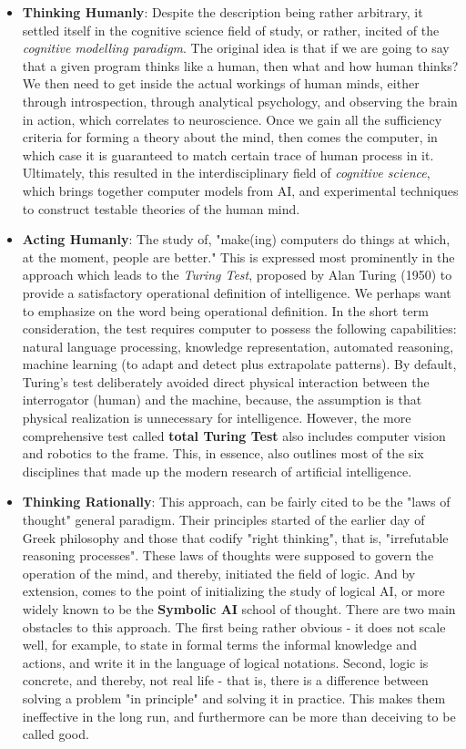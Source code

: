     \begin{itemize}
        \item \textbf{Thinking Humanly}: Despite the description being rather arbitrary, it settled itself in the cognitive science field of study, or rather, incited of the \textit{cognitive modelling paradigm}. The original idea is that if we are going to say that a given program thinks like a human, then what and how human thinks? We then need to get inside the actual workings of human minds, either through introspection, through analytical psychology, and observing the brain in action, which correlates to neuroscience. Once we gain all the sufficiency criteria for forming a theory about the mind, then comes the computer, in which case it is guaranteed to match certain trace of human process in it. Ultimately, this resulted in the interdisciplinary field of \textit{cognitive science}, which brings together computer models from AI, and experimental techniques to construct testable theories of the human mind. 
        \item \textbf{Acting Humanly}: The study of, "make(ing) computers do things at which, at the moment, people are better." This is expressed most prominently in the approach which leads to the \textit{Turing Test}, proposed by Alan Turing (1950) to provide a satisfactory operational definition of intelligence. We perhaps want to emphasize on the word being operational definition. In the short term consideration, the test requires computer to possess the following capabilities: natural language processing, knowledge representation, automated reasoning, machine learning (to adapt and detect plus extrapolate patterns). By default, Turing's test deliberately avoided direct physical interaction between the interrogator (human) and the machine, because, the assumption is that physical realization is unnecessary for intelligence. However, the more comprehensive test called \textbf{total Turing Test} also includes computer vision and robotics to the frame. This, in essence, also outlines most of the six disciplines that made up the modern research of artificial intelligence. 
        \item \textbf{Thinking Rationally}: This approach, can be fairly cited to be the "laws of thought" general paradigm. Their principles started of the earlier day of Greek philosophy and those that codify "right thinking", that is, "irrefutable reasoning processes". These laws of thoughts were supposed to govern the operation of the mind, and thereby, initiated the field of logic. And by extension, comes to the point of initializing the study of logical AI, or more widely known to be the \textbf{Symbolic AI} school of thought. There are two main obstacles to this approach. The first being rather obvious - it does not scale well, for example, to state in formal terms the informal knowledge and actions, and write it in the language of logical notations. Second, logic is concrete, and thereby, not real life - that is, there is a difference between solving a problem "in principle" and solving it in practice. This makes them ineffective in the long run, and furthermore can be more than deceiving to be called good. 

\end{itemize}

